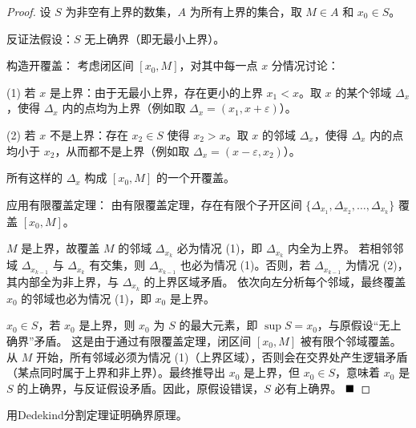 \begin{proof} 
    设 $S$ 为非空有上界的数集，$A$ 为所有上界的集合，取 $M \in A$ 和 $x_0 \in S$。  

    反证法假设：$S$ 无上确界（即无最小上界）。
    
    构造开覆盖：  
    考虑闭区间 $[x_0, M]$，对其中每一点 $x$ 分情况讨论：
    
    (1) 若 $x$ 是上界：由于无最小上界，存在更小的上界 $x_1 < x$。取 $x$ 的某个邻域 $\Delta_x$，使得 $\Delta_x$ 内的点均为上界（例如取 $\Delta_x = (x_1, x + \varepsilon)$）。

    (2) 若 $x$ 不是上界：存在 $x_2 \in S$ 使得 $x_2 > x$。取 $x$ 的邻域 $\Delta_x$，使得 $\Delta_x$ 内的点均小于 $x_2$，从而都不是上界（例如取 $\Delta_x = (x - \varepsilon, x_2)$）。
    
    所有这样的 $\Delta_x$ 构成 $[x_0, M]$ 的一个开覆盖。
    
    应用有限覆盖定理：  
    由有限覆盖定理，存在有限个子开区间 $\{\Delta_{x_1}, \Delta_{x_2}, \dots, \Delta_{x_k}\}$ 覆盖 $[x_0, M]$。
    
     $M$ 是上界，故覆盖 $M$ 的邻域 $\Delta_{x_k}$ 必为情况 (1)，即 $\Delta_{x_k}$ 内全为上界。
    若相邻邻域 $\Delta_{x_{k-1}}$ 与 $\Delta_{x_k}$ 有交集，则 $\Delta_{x_{k-1}}$ 也必为情况 (1)。否则，若 $\Delta_{x_{k-1}}$ 为情况 (2)，其内部全为非上界，与 $\Delta_{x_k}$ 的上界区域矛盾。
    依次向左分析每个邻域，最终覆盖 $x_0$ 的邻域也必为情况 (1)，即 $x_0$ 是上界。
    
    $x_0 \in S$，若 $x_0$ 是上界，则 $x_0$ 为 $S$ 的最大元素，即 $\sup S = x_0$，与原假设“无上确界”矛盾。  
    这是由于通过有限覆盖定理，闭区间 $[x_0, M]$ 被有限个邻域覆盖。从 $M$ 开始，所有邻域必须为情况 (1)（上界区域），否则会在交界处产生逻辑矛盾（某点同时属于上界和非上界）。最终推导出 $x_0$ 是上界，但 $x_0 \in S$，意味着 $x_0$ 是 $S$ 的上确界，与反证假设矛盾。因此，原假设错误，$S$ 必有上确界。
    $\hfill\blacksquare$
\end{proof}

\begin{problem}
    用Dedekind分割定理证明确界原理。
\end{problem}
    
